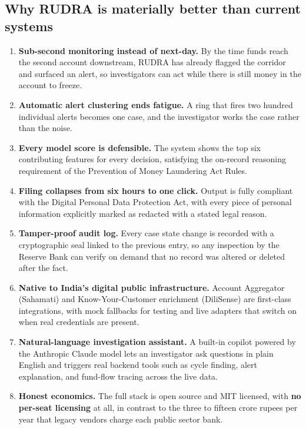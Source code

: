 \documentclass[10pt,a4paper]{article}
\begin{document}
\subsection*{Why RUDRA is materially better than current systems}
\begin{enumerate}
  \item \textbf{Sub-second monitoring instead of next-day.} By the time funds reach the second account downstream, RUDRA has already flagged the corridor and surfaced an alert, so investigators can act while there is still money in the account to freeze.
  \item \textbf{Automatic alert clustering ends fatigue.} A ring that fires two hundred individual alerts becomes one case, and the investigator works the case rather than the noise.
  \item \textbf{Every model score is defensible.} The system shows the top six contributing features for every decision, satisfying the on-record reasoning requirement of the Prevention of Money Laundering Act Rules.
  \item \textbf{Filing collapses from six hours to one click.} Output is fully compliant with the Digital Personal Data Protection Act, with every piece of personal information explicitly marked as redacted with a stated legal reason.
  \item \textbf{Tamper-proof audit log.} Every case state change is recorded with a cryptographic seal linked to the previous entry, so any inspection by the Reserve Bank can verify on demand that no record was altered or deleted after the fact.
  \item \textbf{Native to India's digital public infrastructure.} Account Aggregator (Sahamati) and Know-Your-Customer enrichment (DiliSense) are first-class integrations, with mock fallbacks for testing and live adapters that switch on when real credentials are present.
  \item \textbf{Natural-language investigation assistant.} A built-in copilot powered by the Anthropic Claude model lets an investigator ask questions in plain English and triggers real backend tools such as cycle finding, alert explanation, and fund-flow tracing across the live data.
  \item \textbf{Honest economics.} The full stack is open source and MIT licensed, with \textbf{no per-seat licensing} at all, in contrast to the three to fifteen crore rupees per year that legacy vendors charge each public sector bank.
\end{enumerate}
\end{document}
